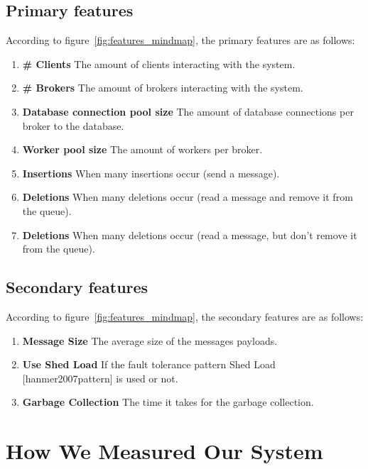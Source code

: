 \documentclass[a4paper]{article}
\begin{document}
\subsection{Primary features}

According to figure~\ref{fig:features_mindmap}, the primary features are as follows:

\begin{enumerate}
  \item \textbf{\# Clients} The amount of clients interacting with the system.
  \item \textbf{\# Brokers} The amount of brokers interacting with the system.
  \item \textbf{Database connection pool size} The amount of database connections per broker to the database.
  \item \textbf{Worker pool size} The amount of workers per broker.
  \item \textbf{Insertions} When many insertions occur (send a message).
  \item \textbf{Deletions} When many deletions occur (read a message and remove it from the queue).
  \item \textbf{Deletions} When many deletions occur (read a message, but don't remove it from the queue).
\end{enumerate}


\subsection{Secondary features}

According to figure~\ref{fig:features_mindmap}, the secondary features are as follows:

\begin{enumerate}
  \item \textbf{Message Size} The average size of the messages payloads.
  \item \textbf{Use Shed Load} If the fault tolerance pattern Shed Load [hanmer2007pattern] is used or not.
  \item \textbf{Garbage Collection} The time it takes for the garbage collection.
\end{enumerate}


\section{How We Measured Our System}
\end{document}
